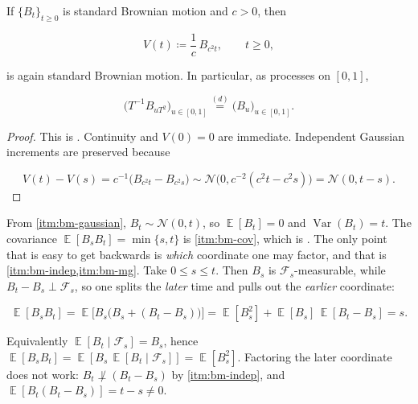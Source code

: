 \documentclass[11pt,a4paper]{article}
\DeclareMathOperator{\Var}{Var}
\DeclareMathOperator{\E}{\mathbb{E}}
\begin{document}
\begin{proposition}
\label{prop:bm-scaling}
If \(\{B_t\}_{t\ge 0}\) is standard Brownian motion and \(c>0\), then

\[
V(t)
\coloneqq
\frac{1}{c}\,B_{c^{2}t},
\qquad
t\ge 0,
\]

is again standard Brownian motion. In particular, as processes on \([0,1]\),

\[
\bigl(T^{-1}B_{uT^{2}}\bigr)_{u\in[0,1]}
\stackrel{(d)}{=}
\bigl(B_u\bigr)_{u\in[0,1]}.
\]
\end{proposition}

\begin{proof}
This is \citep[Exercise~6.28]{brzezniak1999}. Continuity and \(V(0)=0\) are immediate. Independent Gaussian increments are preserved because

\[
V(t)-V(s)
=
c^{-1}\bigl(B_{c^{2}t}-B_{c^{2}s}\bigr)
\sim
\mathcal{N}\bigl(0,c^{-2}(c^{2}t-c^{2}s)\bigr)
=
\mathcal{N}(0,t-s).
\]
\end{proof}

\begin{example}
\label{ex:bm-moments}
From \cref{itm:bm-gaussian}, \(B_t\sim\mathcal{N}(0,t)\), so \(\E[B_t]=0\) and \(\Var(B_t)=t\). The covariance \(\E[B_s B_t]=\min\{s,t\}\) is \cref{itm:bm-cov}, which is \citep[Exercises~6.19--6.21]{brzezniak1999}. The only point that is easy to get backwards is \emph{which} coordinate one may factor, and that is \cref{itm:bm-indep,itm:bm-mg}. Take \(0\le s\le t\). Then \(B_s\) is \(\mathcal{F}_s\)-measurable, while \(B_t-B_s\perp\mathcal{F}_s\), so one splits the \emph{later} time and pulls out the \emph{earlier} coordinate:

\[
\E[B_s B_t]
=
\E\bigl[B_s\bigl(B_s+(B_t-B_s)\bigr)\bigr]
=
\E[B_s^2]
+
\E[B_s]\,\E[B_t-B_s]
=
s.
\]

Equivalently \(\E[B_t\mid\mathcal{F}_s]=B_s\), hence \(\E[B_s B_t]=\E[B_s\,\E[B_t\mid\mathcal{F}_s]]=\E[B_s^2]\). Factoring the later coordinate does not work: \(B_t\not\perp(B_t-B_s)\) by \cref{itm:bm-indep}, and \(\E[B_t(B_t-B_s)]=t-s\neq 0\).
\end{example}
\end{document}
